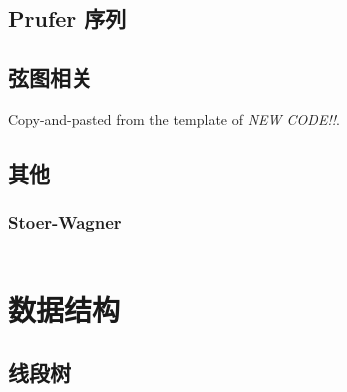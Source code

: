 \documentclass[a4paper, twoside]{article}
\begin{document}
\begin{multicols}{2}
			\subsection{Prufer 序列}
				

			\subsection{弦图相关}
				Copy-and-pasted from the template of \textit{NEW CODE!!}.
				



			

			\subsection{其他}
				\subsubsection[Stoer-Wagner 全局最小割]{Stoer-Wagner}
					\inputminted{cpp}{../src/graph/stoer-wagner.cpp}



			
		\newpage
		\section{数据结构}

			\subsection{线段树}

\end{multicols}
\end{document}
